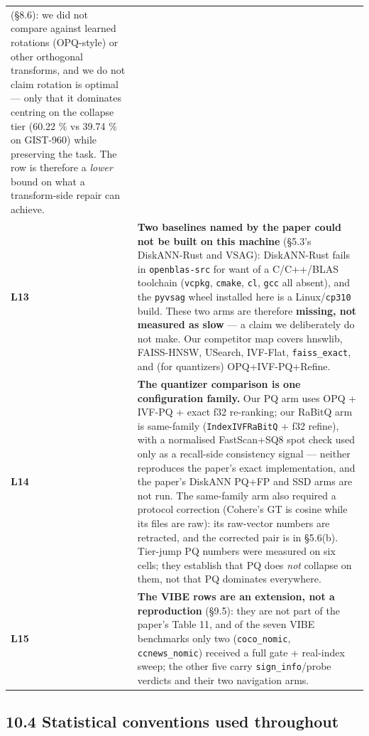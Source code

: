 \documentclass[
  10pt,
]{article}
\begin{document}
{\begin{longtable}[]{@{}
  >{\raggedright\arraybackslash}p{}
  >{\raggedright\arraybackslash}p{}@{}}
{transform was tested} (§8.6): we did not compare against learned
rotations (OPQ-style) or other orthogonal transforms, and we do not
claim rotation is optimal --- only that it dominates centring on the
collapse tier (60.22 \% vs 39.74 \% on GIST-960) while preserving the
task. The row is therefore a \emph{lower} bound on what a transform-side
repair can achieve. \\
\textbf{L13} & \textbf{Two baselines named by the paper could not be
built on this machine} (§5.3's DiskANN-Rust and VSAG): DiskANN-Rust
fails in \texttt{openblas-src} for want of a C/C++/BLAS toolchain
(\texttt{vcpkg}, \texttt{cmake}, \texttt{cl}, \texttt{gcc} all absent),
and the \texttt{pyvsag} wheel installed here is a Linux/\texttt{cp310}
build. These two arms are therefore \textbf{missing, not measured as
slow} --- a claim we deliberately do not make. Our competitor map covers
hnswlib, FAISS-HNSW, USearch, IVF-Flat, \texttt{faiss\_exact}, and (for
quantizers) OPQ+IVF-PQ+Refine. \\
\textbf{L14} & \textbf{The quantizer comparison is one configuration
family.} Our PQ arm uses OPQ + IVF-PQ + exact f32 re-ranking; our RaBitQ
arm is same-family (\texttt{IndexIVFRaBitQ} + f32 refine), with a
normalised FastScan+SQ8 spot check used only as a recall-side
consistency signal --- neither reproduces the paper's exact
implementation, and the paper's DiskANN PQ+FP and SSD arms are not run.
The same-family arm also required a protocol correction (Cohere's GT is
cosine while its files are raw): its raw-vector numbers are retracted,
and the corrected pair is in §5.6(b). Tier-jump PQ numbers were measured
on six cells; they establish that PQ does \emph{not} collapse on them,
not that PQ dominates everywhere. \\
\textbf{L15} & \textbf{The VIBE rows are an extension, not a
reproduction} (§9.5): they are not part of the paper's Table 11, and of
the seven VIBE benchmarks only two (\texttt{coco\_nomic},
\texttt{ccnews\_nomic}) received a full gate + real-index sweep; the
other five carry \texttt{sign\_info}/probe verdicts and their two
navigation arms. \\
\end{longtable}
}

\subsection{10.4 Statistical conventions used
throughout}\label{statistical-conventions-used-throughout}
\end{document}
